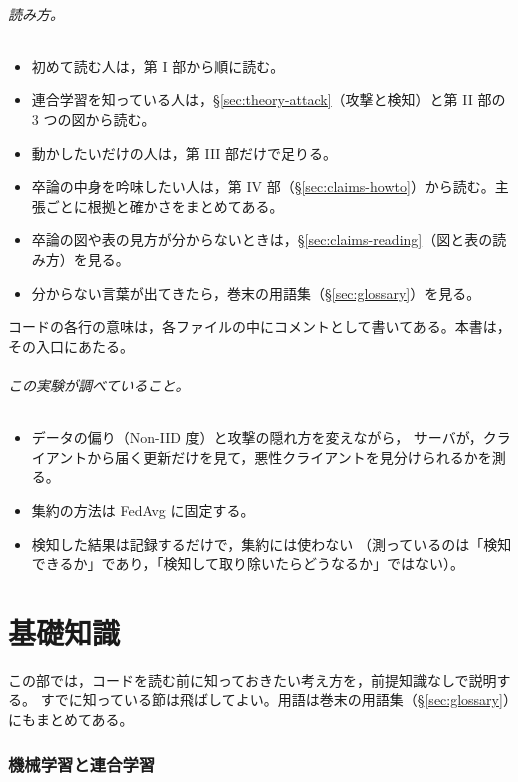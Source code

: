 \documentclass[a4j, dvipdfmx]{jsarticle}  %
\begin{document}
\paragraph{読み方。}
\begin{itemize}
  \item 初めて読む人は，第 I 部から順に読む。
  \item 連合学習を知っている人は，\S\ref{sec:theory-attack}（攻撃と検知）と第 II 部の 3 つの図から読む。
  \item 動かしたいだけの人は，第 III 部だけで足りる。
  \item 卒論の中身を吟味したい人は，第 IV 部（\S\ref{sec:claims-howto}）から読む。主張ごとに根拠と確かさをまとめてある。
  \item 卒論の図や表の見方が分からないときは，\S\ref{sec:claims-reading}（図と表の読み方）を見る。
  \item 分からない言葉が出てきたら，巻末の用語集（\S\ref{sec:glossary}）を見る。
\end{itemize}
コードの各行の意味は，各ファイルの中にコメントとして書いてある。本書は，その入口にあたる。

\paragraph{この実験が調べていること。}
\begin{itemize}
  \item データの偏り（Non-IID 度）と攻撃の隠れ方を変えながら，
        サーバが，クライアントから届く更新だけを見て，悪性クライアントを見分けられるかを測る。
  \item 集約の方法は FedAvg に固定する。
  \item 検知した結果は記録するだけで，集約には使わない
        （測っているのは「検知できるか」であり，「検知して取り除いたらどうなるか」ではない）。
\end{itemize}

\part{基礎知識}
\label{part:basics}

この部では，コードを読む前に知っておきたい考え方を，前提知識なしで説明する。
すでに知っている節は飛ばしてよい。用語は巻末の用語集（\S\ref{sec:glossary}）にもまとめてある。

\section{機械学習と連合学習}
\label{sec:ml-fl}
\end{document}
